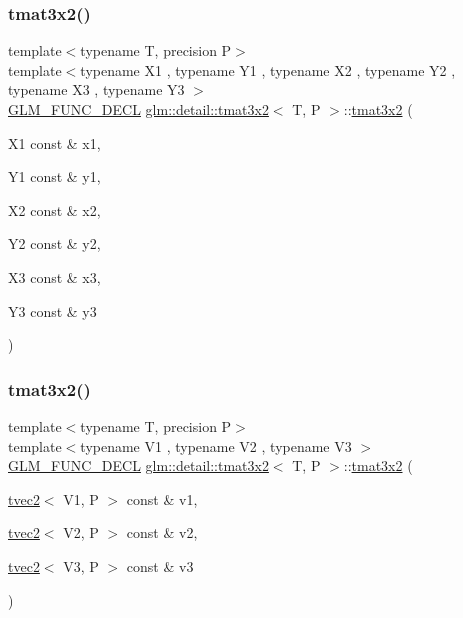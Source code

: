 \subsubsection{\texorpdfstring{tmat3x2()}{tmat3x2()}\hspace{0.1cm}{\footnotesize\ttfamily [8/22]}}
{\footnotesize\ttfamily template$<$typename T, precision P$>$ \\
template$<$typename X1 , typename Y1 , typename X2 , typename Y2 , typename X3 , typename Y3 $>$ \\
\hyperlink{setup_8hpp_ab2d052de21a70539923e9bcbf6e83a51}{G\+L\+M\+\_\+\+F\+U\+N\+C\+\_\+\+D\+E\+CL} \hyperlink{structglm_1_1detail_1_1tmat3x2}{glm\+::detail\+::tmat3x2}$<$ T, P $>$\+::\hyperlink{structglm_1_1detail_1_1tmat3x2}{tmat3x2} (\begin{DoxyParamCaption}\item[{X1 const \&}]{x1,  }\item[{Y1 const \&}]{y1,  }\item[{X2 const \&}]{x2,  }\item[{Y2 const \&}]{y2,  }\item[{X3 const \&}]{x3,  }\item[{Y3 const \&}]{y3 }\end{DoxyParamCaption})}

\mbox{\label{structglm_1_1detail_1_1tmat3x2_af632d84043506726bd86e34fad3a532f}} 
\subsubsection{\texorpdfstring{tmat3x2()}{tmat3x2()}\hspace{0.1cm}{\footnotesize\ttfamily [9/22]}}
{\footnotesize\ttfamily template$<$typename T, precision P$>$ \\
template$<$typename V1 , typename V2 , typename V3 $>$ \\
\hyperlink{setup_8hpp_ab2d052de21a70539923e9bcbf6e83a51}{G\+L\+M\+\_\+\+F\+U\+N\+C\+\_\+\+D\+E\+CL} \hyperlink{structglm_1_1detail_1_1tmat3x2}{glm\+::detail\+::tmat3x2}$<$ T, P $>$\+::\hyperlink{structglm_1_1detail_1_1tmat3x2}{tmat3x2} (\begin{DoxyParamCaption}\item[{\hyperlink{structglm_1_1detail_1_1tvec2}{tvec2}$<$ V1, P $>$ const \&}]{v1,  }\item[{\hyperlink{structglm_1_1detail_1_1tvec2}{tvec2}$<$ V2, P $>$ const \&}]{v2,  }\item[{\hyperlink{structglm_1_1detail_1_1tvec2}{tvec2}$<$ V3, P $>$ const \&}]{v3 }\end{DoxyParamCaption})}

